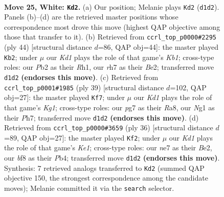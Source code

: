 \documentclass[11pt]{article}
\begin{document}
\clearpage

\begin{figure}[p]\centering
\begin{subfigure}{0.46\textwidth}\centering
\resizebox{\linewidth}{!}{%
\newchessgame
\chessboard[
  setfen={r4b2/2nkn1pr/6b1/7p/p1B1pP1P/P3R3/1P4P1/R2K2NN w - - 10 25},
  showmover=false,
  pgfstyle=straightmove, color=movearrow, markmove={d1-d2}
]}
\caption{}
\end{subfigure}\hfill
\begin{subfigure}{0.46\textwidth}\centering
\resizebox{\linewidth}{!}{%
\newchessgame
\chessboard[
  setfen={4b2r/1pr1kpR1/p3p2p/1n2P3/5P2/1N6/P1P1B1PP/1K5R w - - 1 23},
  showmover=false,
  pgfstyle=straightmove, color=movearrow, markmove={b1-b2}
]}
\caption{}
\end{subfigure}
\\[4pt]
\begin{subfigure}{0.46\textwidth}\centering
\resizebox{\linewidth}{!}{%
\newchessgame
\chessboard[
  setfen={r3r1k1/1p5p/p2b1pp1/3p3n/3N4/3PB2P/PP3PP1/R3RK2 b - - 1 20},
  showmover=false,
  pgfstyle=straightmove, color=movearrow, markmove={g8-f7}
]}
\caption{}
\end{subfigure}\hfill
\begin{subfigure}{0.46\textwidth}\centering
\resizebox{\linewidth}{!}{%
\newchessgame
\chessboard[
  setfen={2r4r/pp1bkpp1/2n1p1p1/8/1P3P2/P3P3/3NB1PP/2R1K2R w K - 1 19},
  showmover=false,
  pgfstyle=straightmove, color=movearrow, markmove={e1-f2}
]}
\caption{}
\end{subfigure}
\caption{\textbf{Move 25, White: \texttt{Kd2}.} (a) Our position; Melanie plays \texttt{Kd2} (\texttt{d1d2}). Panels (b)--(d) are the retrieved master positions whose correspondence most drove this move (highest QAP objective among those that transfer to it). (b) Retrieved from \texttt{ccrl\_top\_p0000\#2295} (ply 44) [structural distance $d$=86, QAP obj=44]: the master played \texttt{Kb2}; under $\mu$ our \emph{Kd1} plays the role of that game's \emph{Kb1}; cross-type roles: our \emph{P}b2 as their \emph{R}h1, our \emph{r}h7 as their \emph{B}e2; transferred move \texttt{d1d2} \textbf{(endorses this move)}. (c) Retrieved from \texttt{ccrl\_top\_p0001\#1985} (ply 39) [structural distance $d$=102, QAP obj=27]: the master played \texttt{Kf7}; under $\mu$ our \emph{Kd1} plays the role of that game's \emph{Kg1}; cross-type roles: our \emph{p}g7 as their \emph{R}a8, our \emph{N}g1 as their \emph{P}h7; transferred move \texttt{d1d2} \textbf{(endorses this move)}. (d) Retrieved from \texttt{ccrl\_top\_p0000\#3659} (ply 36) [structural distance $d$=89, QAP obj=27]: the master played \texttt{Kf2}; under $\mu$ our \emph{Kd1} plays the role of that game's \emph{Ke1}; cross-type roles: our \emph{n}e7 as their \emph{B}e2, our \emph{b}f8 as their \emph{P}b4; transferred move \texttt{d1d2} \textbf{(endorses this move)}. Synthesis: 7 retrieved analogs transferred to \texttt{Kd2} (summed QAP objective 150, the strongest correspondence among the candidate moves); Melanie committed it via the \texttt{search} selector.}
\label{fig:thought-m48}
\end{figure}
\end{document}
